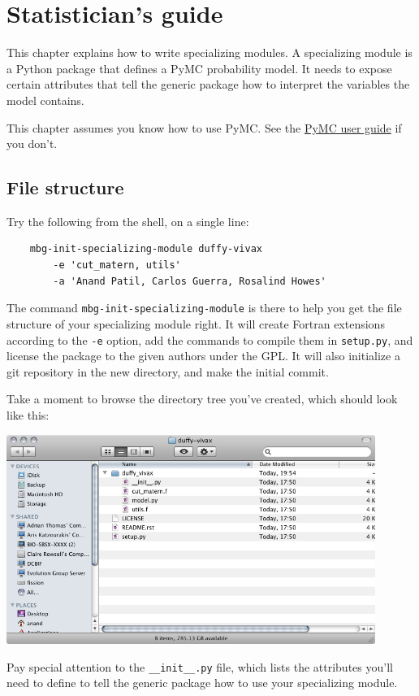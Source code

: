 \chapter{Statistician's guide} 
\label{chap:stat}

This chapter explains how to write specializing modules. A specializing module is a Python package that defines a PyMC probability model. It needs to expose certain attributes that tell the generic package how to interpret the variables the model contains.

This chapter assumes you know how to use PyMC. See the \href{http://code.google.com/p/pymc/}{PyMC user guide} if you don't.




\section{File structure} 
Try the following from the shell, on a single line:
\begin{verbatim}
    mbg-init-specializing-module duffy-vivax 
        -e 'cut_matern, utils' 
        -a 'Anand Patil, Carlos Guerra, Rosalind Howes'
\end{verbatim}
The command \texttt{mbg-init-specializing-module} is there to help you get the file structure of your specializing module right. It will create Fortran extensions according to the \texttt{-e} option, add the commands to compile them in \texttt{setup.py}, and license the package to the given authors under the GPL. It will also initialize a git repository in the new directory, and make the initial commit.

Take a moment to browse the directory tree you've created, which should look like this:
\begin{center}
\includegraphics[width=12cm]{filestructure.png}     
\end{center}
Pay special attention to the \texttt{\_\_init\_\_.py} file, which lists the attributes you'll need to define to tell the generic package how to use your specializing module.

